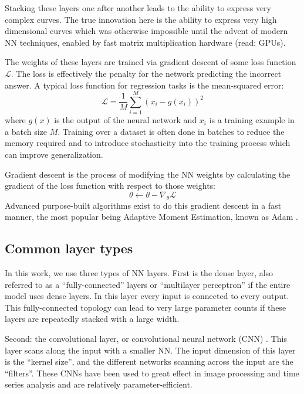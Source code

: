 Stacking these layers one after another leads to the ability to express very complex curves. The true innovation here is the ability to express very high dimensional curves which was otherwise impossible until the advent of modern NN techniques, enabled by fast matrix multiplication hardware (read: GPUs).

The weights of these layers are trained via gradient descent of some loss function $\mathcal{L}$. The loss is effectively the penalty for the network predicting the incorrect answer. A typical loss function for regression tasks is the mean-squared error: 
\begin{equation}
	\mathcal{L} = \frac{1}{M} \sum_{i=1}^M (x_i - g(x_i))^2
\end{equation}
where $g(x)$ is the output of the neural network and $x_i$ is a training example in a batch size $M$. Training over a dataset is often done in batches to reduce the memory required and to introduce stochasticity into the training process which can improve generalization. 

Gradient descent is the process of modifying the NN weights by calculating the gradient of the loss function with respect to those weights:
\begin{equation}
	\theta \gets \theta - \nabla_\theta \mathcal{L}
\end{equation}
Advanced purpose-built algorithms exist to do this gradient descent in a fast manner, the most popular being Adaptive Moment Estimation, known as Adam  \cite{kingma_adam_2017}. 


\subsection{Common layer types}

In this work, we use three types of NN layers. First is the dense layer, also referred to as a ``fully-connected'' layers or ``multilayer perceptron'' if the entire model uses dense layers. In this layer every input is connected to every output. This fully-connected topology can lead to very large parameter counts if these layers are repeatedly stacked with a large width.

Second: the convolutional layer, or convolutional neural network (CNN) \cite{lecun_convolutional_1995}. This layer scans along the input with a smaller NN. The input dimension of this layer is the ``kernel size'', and the different networks scanning across the input are the ``filters''. These CNNs have been used to great effect in image processing and time series analysis and are relatively parameter-efficient.

